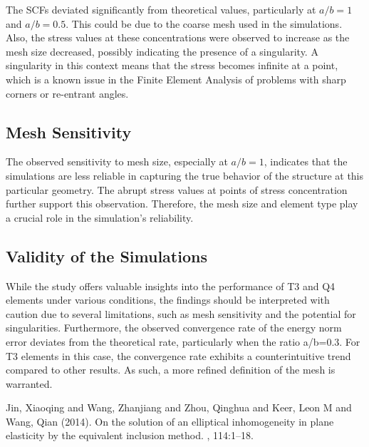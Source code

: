\documentclass[twoside,twocolumn,10pt]{article}
\begin{document}
The SCFs deviated significantly from theoretical values, particularly at \( a/b = 1 \) and \( a/b = 0.5 \). This could be due to the coarse mesh used in the simulations. Also, the stress values at these concentrations were observed to increase as the mesh size decreased, possibly indicating the presence of a singularity. A singularity in this context means that the stress becomes infinite at a point, which is a known issue in the Finite Element Analysis of problems with sharp corners or re-entrant angles.

\subsection*{Mesh Sensitivity }

The observed sensitivity to mesh size, especially at \( a/b = 1 \), indicates that the simulations are less reliable in capturing the true behavior of the structure at this particular geometry. The abrupt stress values at points of stress concentration further support this observation. Therefore, the mesh size and element type play a crucial role in the simulation's reliability.

\subsection*{Validity of the Simulations}

While the study offers valuable insights into the performance of T3 and Q4 elements under various conditions, the findings should be interpreted with caution due to several limitations, such as mesh sensitivity and the potential for singularities. Furthermore, the observed convergence rate of the energy norm error deviates from the theoretical rate, particularly when the ratio a/b=0.3. For T3 elements in this case, the convergence rate exhibits a counterintuitive trend compared to other results. As such, a more refined definition of the mesh is warranted.






\begin{thebibliography}{99} %

Jin, Xiaoqing and Wang, Zhanjiang and Zhou, Qinghua and Keer, Leon M and Wang, Qian (2014).
\newblock On the solution of an elliptical inhomogeneity in plane elasticity by the equivalent inclusion method.
, 114:1--18.
 
\end{thebibliography}
\end{document}
